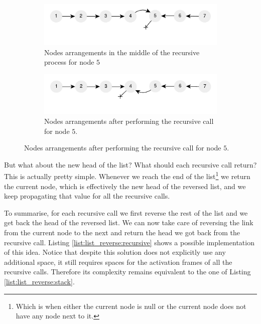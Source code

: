 \begin{figure}
	\vspace*{-0.5in}
	\centering
	\begin{subfigure}[t]{0.49\textwidth}
		\centering
		\includegraphics[width=\textwidth]{sources/list_reverse/images/list_reverse_recursive_intermediate}
		\caption[]{Nodes arrangements in the middle of the recursive process for node $5$}
		\label{fig:list_reverse:list_reverse_recursive_intermediate}
	 \end{subfigure}
	\hfill
	\begin{subfigure}[t]{0.49\textwidth}
		\centering
	\includegraphics[width=\textwidth]{sources/list_reverse/images/list_reverse_recursive_intermediate1}
	\caption[]{Nodes arrangements after performing the recursive call for node $5$.}
	\label{fig:list_reverse:list_reverse_recursive_intermediate1}
	 \end{subfigure}
\end{figure}
But what about the new head of the list? What should each recursive call return? This is actually
pretty simple. Whenever we reach the end of the list\footnote{Which is when either the current node
is null or the current node does not have any node next to it.} we return the current node, which is
effectively the new head of the reversed list, and we keep propagating that value for all the
recursive calls. 

To summarise, for each recursive call we first reverse the rest of the list and we get back the head
of the reversed list. We can now take care of reversing the link from the current node to the next
and return the head we got back from the recursive call. Listing \ref{list:list_reverse:recursive}
shows a possible implementation of this idea. Notice that despite this solution does not explicitly
use any additional space, it still requires spaces for the activation frames of all the recursive
calls. Therefore its complexity remains equivalent to the one of Listing \ref{list:list_reverse:stack}.

